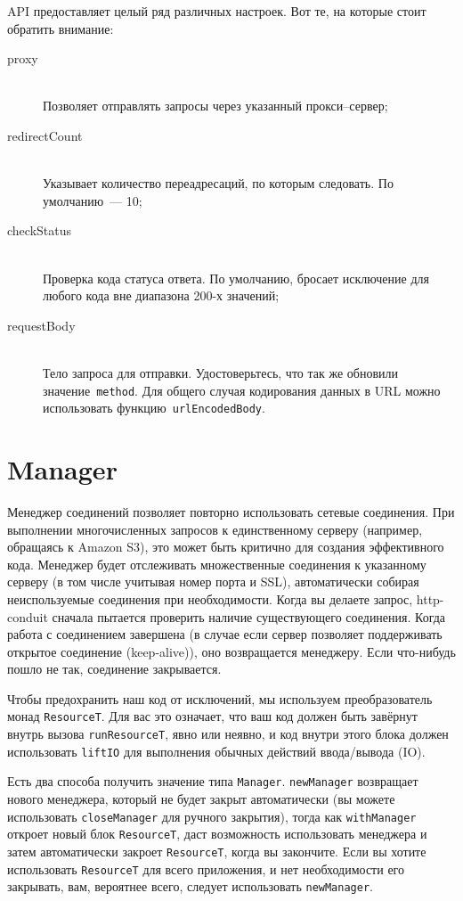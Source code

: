 API предоставляет целый ряд различных настроек. Вот те, на которые стоит
обратить внимание:
\begin{description}
\item[proxy] \hfill \\
  Позволяет отправлять запросы через указанный прокси--сервер;
\item[redirectCount] \hfill \\
  Указывает количество переадресаций, по которым следовать. По
  умолчанию~--- 10;
\item[checkStatus] \hfill \\
  Проверка кода статуса ответа. По умолчанию, бросает исключение
  для любого кода вне диапазона 200-х значений;
\item[requestBody] \hfill \\
  Тело запроса для отправки. Удостоверьтесь, что так же обновили значение~\lstinline!method!.
  Для общего случая кодирования данных в URL можно использовать
  функцию~\lstinline!urlEncodedBody!.
\end{description}

\section{Manager}
Менеджер соединений позволяет повторно использовать
сетевые соединения. При выполнении многочисленных запросов к единственному
серверу (например, обращаясь к Amazon S3), это может быть критично для
создания эффективного кода. Менеджер будет отслеживать множественные
соединения к указанному серверу (в том числе учитывая номер порта и
SSL), автоматически собирая неиспользуемые
соединения при необходимости. Когда вы делаете запрос, http-conduit
сначала пытается проверить наличие существующего соединения. Когда
работа с соединением завершена (в случае если сервер позволяет поддерживать открытое
соединение (keep-alive)), оно возвращается менеджеру. Если
что-нибудь пошло не так, соединение закрывается.

Чтобы предохранить наш код от исключений, мы
используем преобразователь монад \lstinline!ResourceT!. Для вас это
означает, что ваш код должен быть завёрнут внутрь вызова
\lstinline!runResourceT!, явно или неявно, и код внутри этого блока
должен использовать \lstinline!liftIO! для выполнения обычных действий
ввода/вывода (IO).

Есть два способа получить значение типа \lstinline!Manager!.
\lstinline!newManager! возвращает нового менеджера, который не
будет закрыт автоматически (вы можете использовать
\lstinline!closeManager! для ручного закрытия), тогда как
\lstinline!withManager! откроет новый блок \lstinline!ResourceT!, даст
возможность использовать менеджера и затем автоматически закроет
\lstinline!ResourceT!, когда вы закончите. Если вы хотите использовать
\lstinline!ResourceT! для всего приложения, и нет необходимости
его закрывать, вам, вероятнее всего, следует использовать \lstinline!newManager!.

